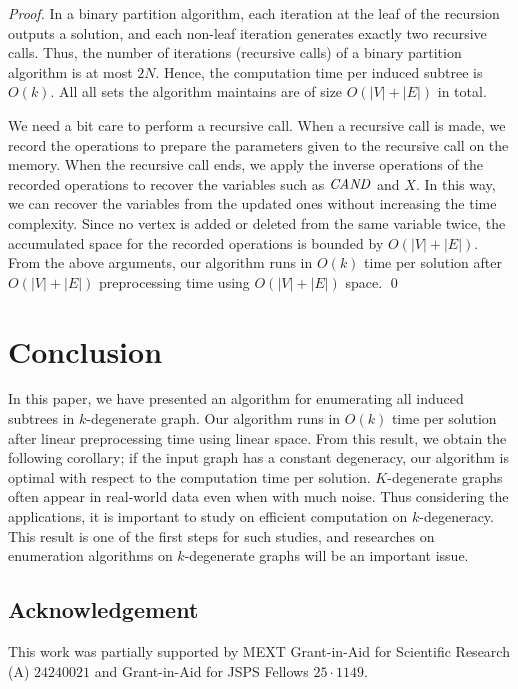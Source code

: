 \documentclass{llncs}
\newcommand{\Can}{{\it CAND}}
\begin{document}
\begin{proof}
    In a binary partition algorithm, 
    each iteration at the leaf of the recursion 
    outputs a solution, 
    and each non-leaf iteration generates exactly two recursive calls. 
    Thus, the number of iterations (recursive calls) of a binary partition algorithm 
    is at most $2N$. 
    Hence, the computation time per induced subtree is $O(k)$. 
    All all sets the algorithm maintains are of size $O(|V|+|E|)$ in total. 


    We need a bit care to perform a recursive call. 
    When a recursive call is made, 
    we record the operations 
    to prepare the parameters given to the recursive call on the memory. 
    When the recursive call ends, 
    we apply the inverse operations of the recorded operations 
    to recover the variables such as $\Can$ and $X$. 
    In this way, 
    we can recover the variables from the updated ones 
    without increasing the time complexity. 
    Since no vertex is added or deleted from the same variable twice, 
    the accumulated space for the recorded operations is bounded by $O(|V|+|E|)$. 
From the above arguments, 
    our algorithm runs in $O(k)$ time per solution 
    after $O(|V|+|E|)$ preprocessing time using $O(|V|+|E|)$ space. 
    \qed
\end{proof}



\section{Conclusion}
\label{sec:conc}

In this paper, 
we have presented an algorithm for enumerating all induced subtrees in $k$-degenerate graph. 
Our algorithm runs in $O(k)$ time per solution after linear preprocessing time 
using linear space. 
From this result, 
we obtain the following corollary; 
if the input graph has a constant degeneracy, 
our algorithm is optimal with respect to the computation time per solution. 
$K$-degenerate graphs often appear in real-world data 
even when with much noise. 
Thus considering the applications, 
it is important to study on efficient computation on $k$-degeneracy. 
This result is one of the first steps for such studies, 
and researches on enumeration algorithms on $k$-degenerate graphs will be an important issue. 




\subsection*{Acknowledgement}
This work was partially supported by 
MEXT Grant-in-Aid for Scientific Research (A) $24240021$ 
and Grant-in-Aid for JSPS Fellows $25\cdot1149$. 
\end{document}
